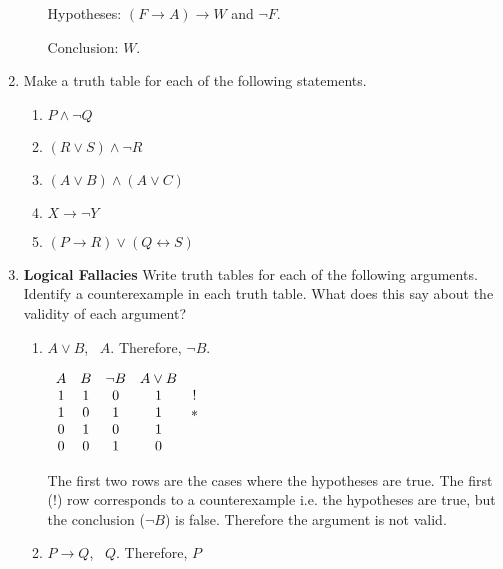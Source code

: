 \documentclass[11pt]{report}
\begin{document}
\begin{enumerate}
\begin{enumerate}
		Hypotheses: $(F \to A) \to W$ and $\lnot F$. 
	
		Conclusion: $W$.
	\end{enumerate}	
	 
	
	\item Make a truth table for each of the following statements.

	\begin{enumerate}
		\item $P \land \lnot Q$
		\item $(R \lor S) \wedge \neg R$
		\item $(A \lor B) \land (A \lor C)$
		\item $X \rightarrow \lnot Y$
		\item $(P \rightarrow R) \vee (Q \leftrightarrow S)$
	\end{enumerate}

	\newpage
	\item {\bf Logical Fallacies} Write truth tables for each of the following arguments. Identify a counterexample in each truth table. What does this say about the validity of each argument?  
	
	\begin{enumerate}
		\item $A \lor B$, \ $A$. Therefore, $\lnot B$.
		
		\hspace{0.2cm}{\bf Solution}

		\begin{center}
			$\begin{array}{c c c c c}
				A & B & \lnot B & A \lor B & \ \\
				1 & 1 & 0 & 1 & ! \\
				1 & 0 & 1 & 1 & * \\
				0 & 1 & 0 & 1 & \ \\
				0 & 0 & 1 & 0 & \ \\
			\end{array}$
		\end{center}

		The first two rows are the cases where the hypotheses are true. The first (!) row corresponds to a counterexample i.e. the hypotheses are true, but the conclusion ($\lnot B$) is false. Therefore the argument is not valid. 

		\item $P \rightarrow Q$, \ $Q$. Therefore, $P$
		
		\hspace{0.2cm}{\bf Solution}


\end{enumerate}
\end{enumerate}
\end{document}
